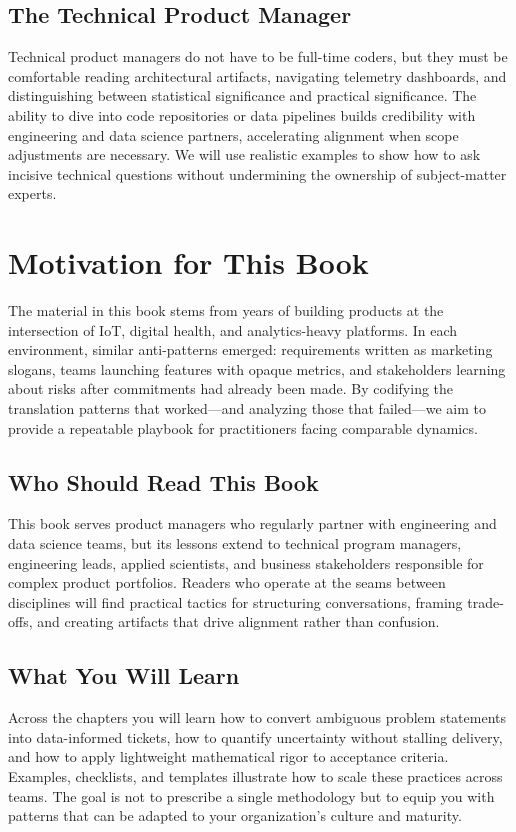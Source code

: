 \subsection{The Technical Product Manager}
Technical product managers do not have to be full-time coders, but they must be comfortable reading architectural artifacts, navigating telemetry dashboards, and distinguishing between statistical significance and practical significance. The ability to dive into code repositories or data pipelines builds credibility with engineering and data science partners, accelerating alignment when scope adjustments are necessary. We will use realistic examples to show how to ask incisive technical questions without undermining the ownership of subject-matter experts.

\section{Motivation for This Book}
\label{sec:motivation}

The material in this book stems from years of building products at the intersection of IoT, digital health, and analytics-heavy platforms. In each environment, similar anti-patterns emerged: requirements written as marketing slogans, teams launching features with opaque metrics, and stakeholders learning about risks after commitments had already been made. By codifying the translation patterns that worked—and analyzing those that failed—we aim to provide a repeatable playbook for practitioners facing comparable dynamics.

\subsection{Who Should Read This Book}
This book serves product managers who regularly partner with engineering and data science teams, but its lessons extend to technical program managers, engineering leads, applied scientists, and business stakeholders responsible for complex product portfolios. Readers who operate at the seams between disciplines will find practical tactics for structuring conversations, framing trade-offs, and creating artifacts that drive alignment rather than confusion.

\subsection{What You Will Learn}
Across the chapters you will learn how to convert ambiguous problem statements into data-informed tickets, how to quantify uncertainty without stalling delivery, and how to apply lightweight mathematical rigor to acceptance criteria. Examples, checklists, and templates illustrate how to scale these practices across teams. The goal is not to prescribe a single methodology but to equip you with patterns that can be adapted to your organization's culture and maturity.

